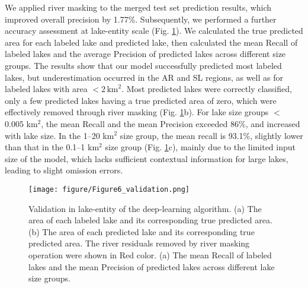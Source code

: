 \documentclass[preprint,12pt,authoryear]{elsarticle}
\begin{document}
We applied river masking to the merged test set prediction results, which improved overall precision by 1.77\%. Subsequently, we performed a further accuracy assessment at lake-entity scale (Fig. \ref{fig:Fig6}). We calculated the true predicted area for each labeled lake and predicted lake, then calculated the mean Recall of labeled lakes and the average Precision of predicted lakes across different size groups. The results show that our model successfully predicted most labeled lakes, but underestimation occurred in the AR and SL regions, as well as for labeled lakes with area $< 2\, \text{km}^2$. Most predicted lakes were correctly classified, only a few predicted lakes having a true predicted area of zero, which were effectively removed through river masking (Fig. \ref{fig:Fig6}b). For lake size groups  $<$ 0.005 km$^2$, the mean Recall and the mean Precision exceeded 86\%, and increased with lake size. In the 1–20 km$^2$ size group, the mean recall is 93.1\%, slightly lower than that in the 0.1–1 km$^2$ size group (Fig. \ref{fig:Fig6}c), mainly due to the limited input size of the model, which lacks sufficient contextual information for large lakes, leading to slight omission errors.

\begin{figure}[h]
    \centering
    \texttt{[image: figure/Figure6\_validation.png]}
    \caption{Validation in lake-entity of the deep-learning algorithm. (a) The area of each labeled lake and its corresponding true predicted area. (b) The area of each predicted lake and its corresponding true predicted area. The river residuals removed by river masking operation were shown in Red color. (a) The mean Recall of labeled lakes and the mean Precision of predicted lakes across different lake size groups.}
    \label{fig:Fig6}
\end{figure}
\end{document}

